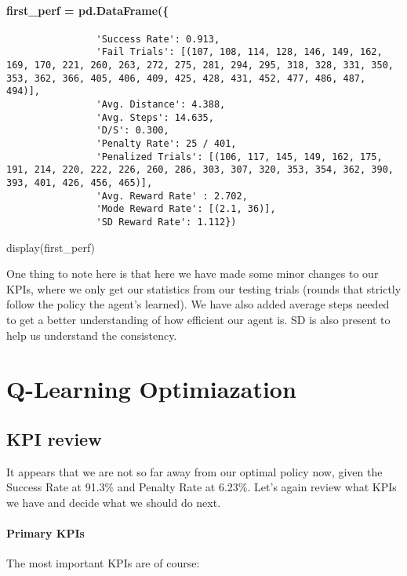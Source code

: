 \documentclass{article}
\begin{document}
    \paragraph{first\_perf =
pd.DataFrame(\{}\label{firstux5fperf-pd.dataframe}

\begin{verbatim}
                'Success Rate': 0.913,
                'Fail Trials': [(107, 108, 114, 128, 146, 149, 162, 169, 170, 221, 260, 263, 272, 275, 281, 294, 295, 318, 328, 331, 350, 353, 362, 366, 405, 406, 409, 425, 428, 431, 452, 477, 486, 487, 494)],
                'Avg. Distance': 4.388,
                'Avg. Steps': 14.635,
                'D/S': 0.300,
                'Penalty Rate': 25 / 401,
                'Penalized Trials': [(106, 117, 145, 149, 162, 175, 191, 214, 220, 222, 226, 260, 286, 303, 307, 320, 353, 354, 362, 390, 393, 401, 426, 456, 465)],
                'Avg. Reward Rate' : 2.702,
                'Mode Reward Rate': [(2.1, 36)],
                'SD Reward Rate': 1.112})
\end{verbatim}

display(first\_perf)

    One thing to note here is that here we have made some minor changes to
our KPIs, where we only get our statistics from our testing trials
(rounds that strictly follow the policy the agent's learned). We have
also added average steps needed to get a better understanding of how
efficient our agent is. SD is also present to help us understand the
consistency.

\section{Q-Learning Optimiazation}\label{q-learning-optimiazation}

\subsection{KPI review}\label{kpi-review}

It appears that we are not so far away from our optimal policy now,
given the Success Rate at 91.3\% and Penalty Rate at 6.23\%. Let's again
review what KPIs we have and decide what we should do next.

\paragraph{Primary KPIs}\label{primary-kpis}

The most important KPIs are of course:
\end{document}
